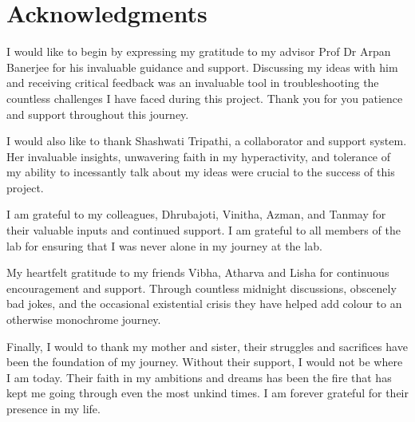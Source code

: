 

\chapter*{Acknowledgments}


I would like to begin by expressing my gratitude to my advisor Prof Dr Arpan Banerjee for his invaluable guidance and support. Discussing my ideas with him and receiving critical feedback was an invaluable tool 
in troubleshooting the countless challenges I have faced during this project. Thank you for you patience and support throughout this journey.

I would also like to thank Shashwati Tripathi, a collaborator and support system. Her invaluable insights, unwavering faith in my hyperactivity, and tolerance of 
my ability to incessantly talk about my ideas were crucial to the success of this project.

I am grateful to my colleagues, Dhrubajoti, Vinitha, Azman, and Tanmay for their valuable inputs and continued support. I am grateful to all members of the lab for 
ensuring that I was never alone in my journey at the lab.

My heartfelt gratitude to my friends Vibha, Atharva and Lisha for continuous encouragement and support. Through countless midnight discussions, obscenely bad jokes, 
and the occasional existential crisis they have helped add colour to an otherwise monochrome journey.

Finally, I would to thank my mother and sister, their struggles and sacrifices have been the foundation of my journey. Without their support, I would not be where I 
am today. Their faith in my ambitions and dreams has been the fire that has kept me going through even the most unkind times. I am forever grateful for their presence 
in my life. 

